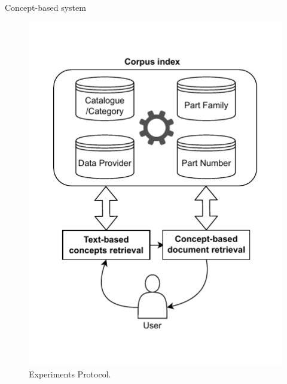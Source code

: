 \begin{frame}{Concept-based system}

    \begin{figure} [H]
        \begin{center}
            \includegraphics[scale=0.6]{images/tp-expe-concept-based-sys.pdf} 
            \caption{Experiments Protocol.} 
        \end{center}
    \end{figure}

\end{frame}

